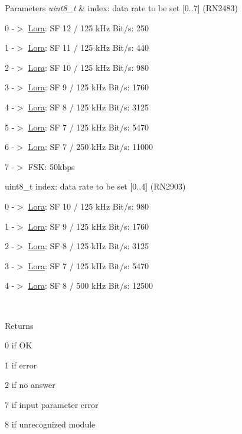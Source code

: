 \begin{DoxyParams}{Parameters}
{\em uint8\+\_\+t} & index\+: data rate to be set \mbox{[}0..7\mbox{]} (R\+N2483) \begin{DoxyItemize}
\item 0 -\/$>$ \hyperlink{class_lora}{Lora}\+: SF 12 / 125 k\+Hz Bit/s\+: 250 \item 1 -\/$>$ \hyperlink{class_lora}{Lora}\+: SF 11 / 125 k\+Hz Bit/s\+: 440 \item 2 -\/$>$ \hyperlink{class_lora}{Lora}\+: SF 10 / 125 k\+Hz Bit/s\+: 980 \item 3 -\/$>$ \hyperlink{class_lora}{Lora}\+: SF 9 / 125 k\+Hz Bit/s\+: 1760 \item 4 -\/$>$ \hyperlink{class_lora}{Lora}\+: SF 8 / 125 k\+Hz Bit/s\+: 3125 \item 5 -\/$>$ \hyperlink{class_lora}{Lora}\+: SF 7 / 125 k\+Hz Bit/s\+: 5470 \item 6 -\/$>$ \hyperlink{class_lora}{Lora}\+: SF 7 / 250 k\+Hz Bit/s\+: 11000 \item 7 -\/$>$ F\+SK\+: 50kbps \begin{DoxyVerb}    uint8_t index: data rate to be set [0..4] (RN2903)  
\end{DoxyVerb}
 \item 0 -\/$>$ \hyperlink{class_lora}{Lora}\+: SF 10 / 125 k\+Hz Bit/s\+: 980 \item 1 -\/$>$ \hyperlink{class_lora}{Lora}\+: SF 9 / 125 k\+Hz Bit/s\+: 1760 \item 2 -\/$>$ \hyperlink{class_lora}{Lora}\+: SF 8 / 125 k\+Hz Bit/s\+: 3125 \item 3 -\/$>$ \hyperlink{class_lora}{Lora}\+: SF 7 / 125 k\+Hz Bit/s\+: 5470 \item 4 -\/$>$ \hyperlink{class_lora}{Lora}\+: SF 8 / 500 k\+Hz Bit/s\+: 12500\end{DoxyItemize}
\\
\hline
\end{DoxyParams}
\begin{DoxyReturn}{Returns}
\begin{DoxyItemize}
\item \textquotesingle{}0\textquotesingle{} if OK \item \textquotesingle{}1\textquotesingle{} if error \item \textquotesingle{}2\textquotesingle{} if no answer \item \textquotesingle{}7\textquotesingle{} if input parameter error \item \textquotesingle{}8\textquotesingle{} if unrecognized module \end{DoxyItemize}

\end{DoxyReturn}
